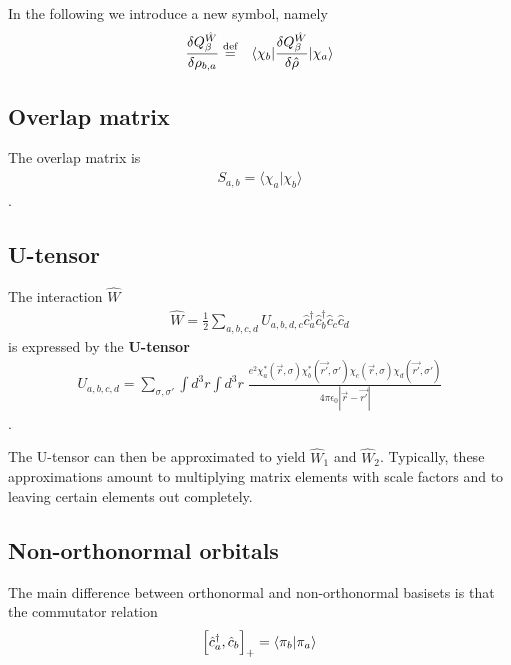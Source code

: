 \documentclass[11pt,a4paper]{report}
\begin{document}
In the following we introduce a new symbol, namely
\begin{eqnarray}
\frac{\delta Q_\beta^{\hat{W}}}{\delta\rho_{b,a}}
&\stackrel{\text{def}}{=}&
\langle\chi_b|\frac{\delta Q_\beta^{\hat{W}}}{\delta\hat{\rho}}
|\chi_a\rangle
\end{eqnarray}

\subsection{Overlap matrix}
The overlap matrix is
\begin{eqnarray}
S_{a,b}=\langle\chi_a|\chi_b\rangle
\end{eqnarray}.

\subsection{U-tensor}
The interaction $\hat{W}$  
\begin{eqnarray}
\hat{W}
=\frac{1}{2}\sum_{a,b,c,d} U_{a,b,d,c}
\hat{c}^\dagger_a\hat{c}^\dagger_b\hat{c}_c\hat{c}_d
\end{eqnarray}
is expressed by the \textbf{U-tensor}
\begin{eqnarray}
U_{a,b,c,d}=\sum_{\sigma,\sigma'}\int d^3r\int d^3r\;
\frac{e^2\chi^*_a(\vec{r},\sigma)\chi^*_b(\vec{r'},\sigma')
\chi_c(\vec{r},\sigma)\chi_d(\vec{r'},\sigma')}
{4\pi\epsilon_0|\vec{r}-\vec{r'}|}
\end{eqnarray}.

The U-tensor can then be approximated to yield $\hat{W}_1$ and
$\hat{W}_2$. Typically, these approximations amount to multiplying
matrix elements with scale factors and to leaving certain elements
out completely.

\subsection{Non-orthonormal orbitals}
The main difference\cite{bloechl11_prb84_205101} between orthonormal
and non-orthonormal basisets is that the commutator relation
\begin{eqnarray}
\Bigl[\hat{c}^\dagger_a,\hat{c}_b\Bigr]_+=\langle\pi_b|\pi_a\rangle
\end{eqnarray}
\end{document}
